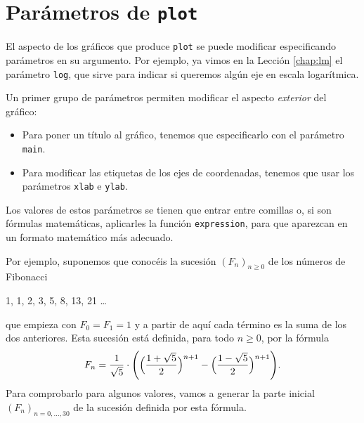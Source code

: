 \documentclass[
]{book}
\providecommand{\tightlist}{%
  \setlength{\itemsep}{0pt}\setlength{\parskip}{0pt}}
\theoremstyle{definition}
\theoremstyle{definition}
\theoremstyle{definition}
\theoremstyle{remark}
\begin{document}
\hypertarget{paruxe1metros-de-plot}{%
\section{\texorpdfstring{Parámetros de \texttt{plot}}{Parámetros de plot}}\label{paruxe1metros-de-plot}}

El aspecto de los gráficos que produce \texttt{plot} se puede modificar especificando parámetros en su argumento. Por ejemplo, ya vimos en la Lección \ref{chap:lm} el parámetro \texttt{log}, que sirve para indicar si queremos algún eje en escala logarítmica.

Un primer grupo de parámetros permiten modificar el aspecto \emph{exterior} del gráfico:

\begin{itemize}
\tightlist
\item
  Para poner un título al gráfico, tenemos que especificarlo con el parámetro \texttt{main}.
\item
  Para modificar las etiquetas de los ejes de coordenadas, tenemos que usar los parámetros \texttt{xlab} e \texttt{ylab}.
\end{itemize}

Los valores de estos parámetros se tienen que entrar entre comillas o, si son fórmulas matemáticas, aplicarles la función \texttt{expression}, para que aparezcan en un formato matemático más adecuado.

Por ejemplo, suponemos que conocéis la sucesión \((F_n)_{n\geqslant 0}\) de los números de Fibonacci

1, 1, 2, 3, 5, 8, 13, 21 \ldots{}

que empieza con \(F_0=F_1=1\) y a partir de aquí cada término es la suma de los dos anteriores. Esta sucesión está definida, para todo \(n\geqslant 0\), por la fórmula
\[
F_n=\frac{1}{\sqrt{5}}\cdot\Biggl(
\Bigl(\frac{1+\sqrt{5}}{2}\Bigr)^{n+1}-
\Bigl(\frac{1-\sqrt{5}}{2}\Bigr)^{n+1}\Biggl).
\]
Para comprobarlo para algunos valores, vamos a generar la parte inicial \((F_n)_{n=0, \ldots, 30}\) de la sucesión definida por esta fórmula.
\end{document}
